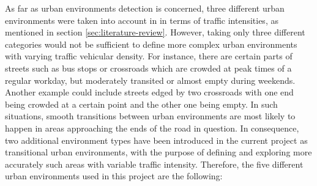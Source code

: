 \documentclass[bsc,frontabs,twoside,singlespacing, parskip,deptreport]{infthesis}     %
\begin{document}
As far as urban environments detection is concerned, three different urban environments were taken into account in \cite{rome2017} in terms of traffic intensities, as mentioned in section \ref{sec:literature-review}. However, taking only three different categories would not be sufficient to define more complex urban environments with varying traffic vehicular density. For instance, there are certain parts of streets such as bus stops or crossroads which are crowded at peak times of a regular workday, but moderately transited or almost empty during weekends. Another example could include streets edged by two crossroads with one end being crowded at a certain point and the other one being empty. In such situations, smooth transitions between urban environments are most likely to happen in areas approaching the ends of the road in question. In consequence, two additional environment types have been introduced in the current project as transitional urban environments, with the purpose of defining and exploring more accurately such areas with variable traffic intensity. Therefore, the five different urban environments used in this project are the following:
\end{document}
